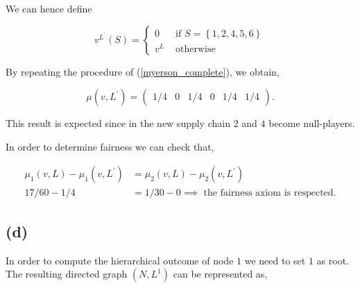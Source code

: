 \documentclass[american]{scrartcl}
\newcommand{\set}[1]{\left\{#1\right\}}
\begin{document}
We can hence define

\begin{equation}
    v^{L^\prime}(S) = \begin{cases}
        0   & \text{ if } S = \set{1, 2, 4, 5, 6} \\
        v^L & \text{ otherwise }
    \end{cases}
\end{equation}

By repeating the procedure of (\ref{myerson_complete}), we obtain,

\begin{equation}
    \mu(v, L^\prime) = \begin{pmatrix}
        1/4 & 0 & 1/4 & 0 & 1/4 & 1/4
    \end{pmatrix}.
\end{equation}

This result is expected since in the new supply chain $2$ and $4$ become null-players.

In order to determine fairness we can check that,

\begin{equation}
    \begin{split}
        \mu_1(v, L) - \mu_1(v, L^\prime) &= \mu_2(v, L) - \mu_2(v, L^\prime) \\
        17/60 - 1 / 4 &= 1/30 - 0 \implies \text{ the fairness axiom is respected.}
    \end{split}
\end{equation}

\subsection*{(d)}

In order to compute the hierarchical outcome of node $1$ we need to set $1$ as root. The resulting directed graph $(N, L^1)$ can be represented as,


\vspace{1cm}
\begin{center}
\end{center}
\end{document}
